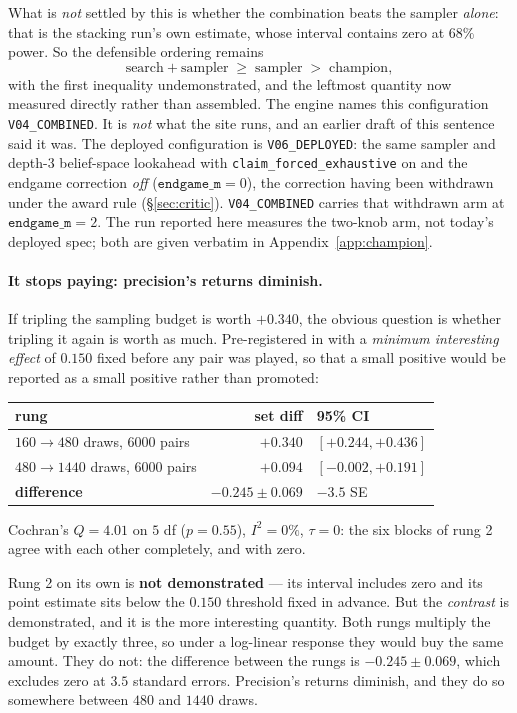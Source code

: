 \documentclass[11pt,letterpaper]{article}
\begin{document}
What is \emph{not} settled by this is whether the combination beats the sampler
\emph{alone}: that is the stacking run's own estimate, whose interval contains
zero at $68\%$ power. So the defensible ordering remains
\[
  \text{search}+\text{sampler} \;\ge\; \text{sampler} \;>\; \text{champion},
\]
with the first inequality undemonstrated, and the leftmost quantity now
measured directly rather than assembled. The engine names this configuration
\texttt{V04\_COMBINED}. It is \emph{not} what the site runs, and an earlier
draft of this sentence said it was. The deployed configuration is
\texttt{V06\_DEPLOYED}: the same sampler and depth-3 belief-space lookahead
with \texttt{claim\_forced\_exhaustive} on and the endgame correction
\emph{off} ($\texttt{endgame\_m}=0$), the correction having been withdrawn
under the award rule (\S\ref{sec:critic}). \texttt{V04\_COMBINED} carries
that withdrawn arm at $\texttt{endgame\_m}=2$. The run reported here measures
the two-knob arm, not today's deployed spec; both are given verbatim in
Appendix~\ref{app:champion}.

\paragraph{It stops paying: precision's returns diminish.} If tripling the
sampling budget is worth $+0.340$, the obvious question is whether tripling it
again is worth as much. Pre-registered in
 with a \emph{minimum interesting
effect} of $0.150$ fixed before any pair was played, so that a small positive
would be reported as a small positive rather than promoted:
\begin{center}
\begin{tabular}{lrl}
\toprule
rung & set diff & 95\% CI \\
\midrule
$160 \to 480$ draws, 6000 pairs & $\mathbf{+0.340}$ & $[+0.244, +0.436]$ \\
$480 \to 1440$ draws, 6000 pairs & $+0.094$ & $[-0.002, +0.191]$ \\
\midrule
\textbf{difference} & $\mathbf{-0.245 \pm 0.069}$ & $\mathbf{-3.5}$ SE \\
\bottomrule
\end{tabular}
\end{center}
Cochran's $Q = 4.01$ on $5$ df ($p = 0.55$), $I^2 = 0\%$, $\tau = 0$: the six
blocks of rung 2 agree with each other completely, and with zero.

Rung 2 on its own is \textbf{not demonstrated} --- its interval includes zero
and its point estimate sits below the $0.150$ threshold fixed in advance. But
the \emph{contrast} is demonstrated, and it is the more interesting quantity.
Both rungs multiply the budget by exactly three, so under a log-linear response
they would buy the same amount. They do not: the difference between the rungs
is $-0.245 \pm 0.069$, which excludes zero at $3.5$ standard errors.
Precision's returns diminish, and they do so somewhere between $480$ and $1440$
draws.
\end{document}
